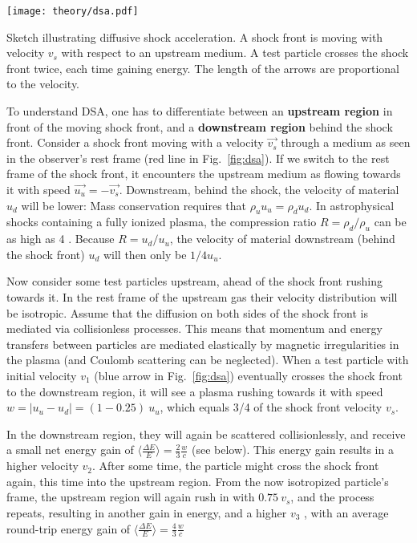 \begin{marginfigure}
    \texttt{[image: theory/dsa.pdf]}
    \caption[Diffusive shock acceleration]{Sketch illustrating diffusive shock acceleration. A shock front is moving with velocity $v_s$ with respect to an upstream medium. A test particle crosses the shock front twice, each time gaining energy. The length of the arrows are proportional to the velocity.}
\end{marginfigure}

To understand DSA, one has to differentiate between an \textbf{upstream region} in front of the moving shock front, and a \textbf{downstream region} behind the shock front. Consider a shock front moving with a velocity $\vec{v_s}$ through a medium as seen in the observer's rest frame (red line in Fig.~\ref{fig:dsa}). If we switch to the rest frame of the shock front, it encounters the upstream medium as flowing towards it with speed $\vec{u_u}=-\vec{v_s}$. Downstream, behind the shock, the velocity of material $u_d$ will be lower: Mass conservation requires that $\rho_u u_u = \rho_d u_d$. In astrophysical shocks containing a fully ionized plasma, the compression ratio $R=\rho_d/\rho_u$ can be as high as 4 . Because $R=u_d/u_u$, the velocity of material downstream (behind the shock front) $u_d$ will then only be $1/4 u_u$.

Now consider some test particles upstream, ahead of the shock front rushing towards it. In the rest frame of the upstream gas their velocity distribution will be isotropic. Assume that the diffusion on both sides of the shock front is mediated via collisionless processes. This means that momentum and energy transfers between particles are mediated elastically by magnetic irregularities in the plasma (and Coulomb scattering can be neglected). When a test particle with initial velocity $v_1$ (blue arrow in Fig.~\ref{fig:dsa}) eventually crosses the shock front to the downstream region, it will see a plasma rushing towards it with speed $w=|u_u-u_d| = (1-0.25)~u_u$, which equals 3/4 of the shock front velocity $v_s$.

In the downstream region, they will again be scattered collisionlessly, and receive a small net energy gain of $\big\langle\frac{\Delta E}{E}\big\rangle = \frac{2}{3}\frac{w}{c}$ (see below). This energy gain results in a higher velocity $v_2$. After some time, the particle might cross the shock front again, this time into the upstream region. From the now isotropized particle's frame, the upstream region will again rush in with $0.75~v_s$, and the process repeats, resulting in another gain in energy, and a higher $v_3$ , with an average round-trip energy gain of $\big\langle\frac{\Delta E}{E}\big\rangle = \frac{4}{3}\frac{w}{c}$

